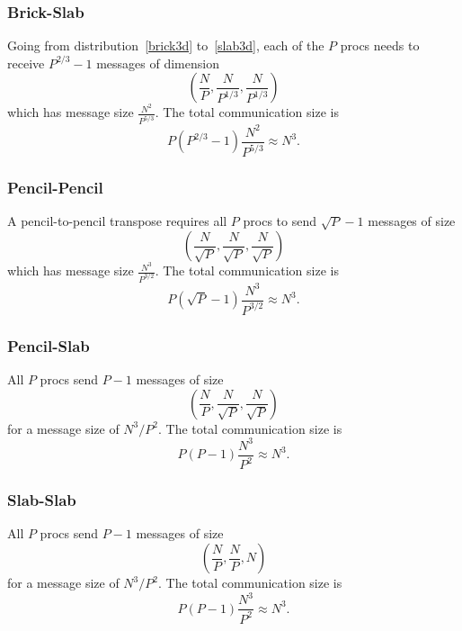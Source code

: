 \documentclass[12pt]{article}
\renewcommand{\(}{\left(}
\renewcommand{\)}{\right)}
\begin{document}
\subsubsection{Brick-Slab}
Going from distribution~\eqref{brick3d} to~\eqref{slab3d}, each of the
$P$ procs needs to receive $P^{2/3}-1$ messages of dimension
\begin{dmath}
  \left(\frac{N}{P}, \frac{N}{P^{1/3}}, \frac{N}{P^{1/3}} \right)
\end{dmath}
which has message size $\frac{N^2}{P^{5/3}}$.  The total communication
  size is
\begin{dmath}
  P\(P^{2/3}-1\) \frac{N^2}{P^{5/3}} \approx N^3.
\end{dmath}

\subsubsection{Pencil-Pencil}
A pencil-to-pencil transpose requires all $P$ procs to send
$\sqrt{P}-1$ messages of size
\begin{dmath}
  \left(\frac{N}{\sqrt{P}}, \frac{N}{\sqrt{P}}, \frac{N}{\sqrt{P}} \right)
\end{dmath}
which has message size $\frac{N^3}{P^{3/2}}$.  The total communication
size is
\begin{dmath}
  P \(\sqrt{P}-1\) \frac{N^3}{P^{3/2}} \approx N^3.
\end{dmath}

\subsubsection{Pencil-Slab}
All $P$ procs send $P-1$ messages of size
\begin{dmath}
  \left(\frac{N}{P}, \frac{N}{\sqrt{P}}, \frac{N}{\sqrt{P}} \right)
\end{dmath}
for a message size of $N^3/P^2$.  The total communication size is
\begin{dmath}
  P \(P-1\) \frac{N^3}{P^2} \approx N^3.
\end{dmath}

\subsubsection{Slab-Slab}
All $P$ procs send $P-1$ messages of size
\begin{dmath}
  \left(\frac{N}{P}, \frac{N}{P}, N \right)
\end{dmath}
for a message size of $N^3/P^2$. The total communication size is
\begin{dmath}
  P \(P-1\) \frac{N^3}{P^2} \approx N^3.
\end{dmath}
\end{document}
